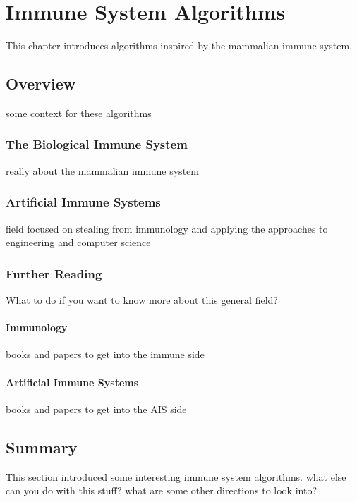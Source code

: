 \chapter{Immune System Algorithms}
\label{ch:immune}

This chapter introduces algorithms inspired by the mammalian immune system. 

\section{Overview}
some context for these algorithms

\subsection{The Biological Immune System}
really about the mammalian immune system

\subsection{Artificial Immune Systems}
field focused on stealing from immunology and applying the approaches to engineering and computer science

\subsection{Further Reading}
What to do if you want to know more about this general field?

\subsubsection{Immunology}
books and papers to get into the immune side

\subsubsection{Artificial Immune Systems}
books and papers to get into the AIS side







\section{Summary}
This section introduced some interesting immune system algorithms. what else can you do with this stuff? what are some other directions to look into?


